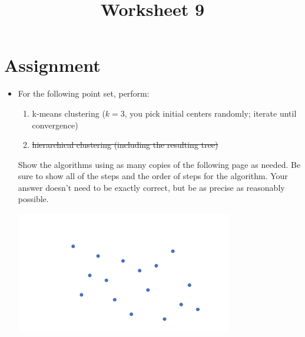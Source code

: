 \documentclass[a4paper,12pt]{article}
\title{Worksheet 9}
\begin{document}
\maketitle

\worksheetGroundRules


\vspace{5pt}
\section{Assignment}

\begin{itemize}



\item For the following point set, perform:
\begin{enumerate}
\item k-means clustering ($k=3$, you pick initial centers randomly; iterate until convergence)
\item \st{hierarchical clustering (including the resulting tree)}
\end{enumerate}
Show the algorithms using as many copies of the following page as needed. Be sure to show all of the steps and the order of steps for the algorithm. Your answer doesn't need to be exactly correct, but be as precise as reasonably possible.

\begin{center}
\includegraphics[width=9.5cm]{../images/spatial_subd.pdf}
\end{center}



\end{itemize}


\worksheetSubmission




\newpage
\end{document}
